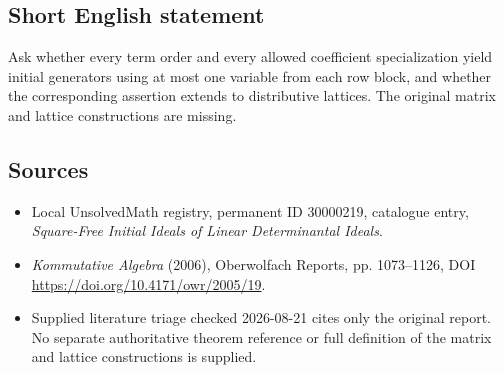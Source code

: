 \documentclass[11pt]{article}
\begin{document}
\subsection{Short English statement}
Ask whether every term order and every allowed coefficient specialization yield initial generators using at most one variable from each row block, and whether the corresponding assertion extends to distributive lattices. The original matrix and lattice constructions are missing.
\subsection{Sources}
\begin{itemize}
\item Local UnsolvedMath registry, permanent ID 30000219, catalogue entry, \emph{Square-Free Initial Ideals of Linear Determinantal Ideals}.
\item \emph{Kommutative Algebra} (2006), Oberwolfach Reports, pp. 1073--1126, DOI \url{https://doi.org/10.4171/owr/2005/19}.
\item Supplied literature triage checked 2026-08-21 cites only the original report. No separate authoritative theorem reference or full definition of the matrix and lattice constructions is supplied.
\end{itemize}
\end{document}
